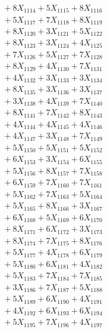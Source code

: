 \documentclass[a4paper,10pt]{article}
\begin{document}
{\begin{align}
&\;  + 8 X_{1114} + 5 X_{1115} + 8 X_{1116} \\[0.3ex]
&\;  + 5 X_{1117} + 7 X_{1118} + 8 X_{1119} \\[0.5ex]\allowbreak
&\;  + 8 X_{1120} + 3 X_{1121} + 5 X_{1122} \\[0.3ex]
&\;  + 8 X_{1123} + 3 X_{1124} + 4 X_{1125} \\[0.3ex]
&\;  + 7 X_{1126} + 5 X_{1127} + 7 X_{1128} \\[0.3ex]
&\;  + 8 X_{1129} + 4 X_{1130} + 7 X_{1131} \\[0.3ex]
&\;  + 4 X_{1132} + 3 X_{1133} + 3 X_{1134} \\[0.3ex]
&\;  + 8 X_{1135} + 3 X_{1136} + 3 X_{1137} \\[0.3ex]
&\;  + 3 X_{1138} + 4 X_{1139} + 7 X_{1140} \\[0.3ex]
&\;  + 8 X_{1141} + 7 X_{1142} + 8 X_{1143} \\[0.3ex]
&\;  + 4 X_{1144} + 4 X_{1145} + 4 X_{1146} \\[0.3ex]
&\;  + 4 X_{1147} + 3 X_{1148} + 7 X_{1149} \\[0.5ex]\allowbreak
&\;  + 5 X_{1150} + 5 X_{1151} + 5 X_{1152} \\[0.3ex]
&\;  + 6 X_{1153} + 3 X_{1154} + 6 X_{1155} \\[0.3ex]
&\;  + 5 X_{1156} + 8 X_{1157} + 7 X_{1158} \\[0.3ex]
&\;  + 6 X_{1159} + 7 X_{1160} + 7 X_{1161} \\[0.3ex]
&\;  + 5 X_{1162} + 7 X_{1163} + 5 X_{1164} \\[0.3ex]
&\;  + 5 X_{1165} + 8 X_{1166} + 3 X_{1167} \\[0.3ex]
&\;  + 6 X_{1168} + 5 X_{1169} + 6 X_{1170} \\[0.3ex]
&\;  + 8 X_{1171} + 6 X_{1172} + 3 X_{1173} \\[0.3ex]
&\;  + 8 X_{1174} + 7 X_{1175} + 8 X_{1176} \\[0.3ex]
&\;  + 5 X_{1177} + 4 X_{1178} + 6 X_{1179} \\[0.5ex]\allowbreak
&\;  + 5 X_{1180} + 6 X_{1181} + 4 X_{1182} \\[0.3ex]
&\;  + 5 X_{1183} + 7 X_{1184} + 7 X_{1185} \\[0.3ex]
&\;  + 3 X_{1186} + 7 X_{1187} + 5 X_{1188} \\[0.3ex]
&\;  + 5 X_{1189} + 6 X_{1190} + 4 X_{1191} \\[0.3ex]
&\;  + 4 X_{1192} + 6 X_{1193} + 6 X_{1194} \\[0.3ex]
&\;  + 5 X_{1195} + 7 X_{1196} + 4 X_{1197} \\[0.3ex]

\end{align}}
\end{document}
